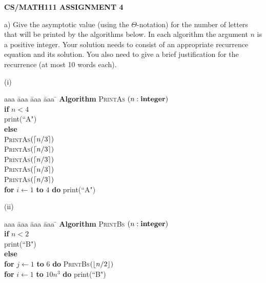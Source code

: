 \documentclass{article}
\begin{document}
\centerline{\large \bf CS/MATH111 ASSIGNMENT 4}

\vskip 0.2in


\vskip 0.1in


\begin{problem}
a)
Give the asymptotic value (using the $\Theta$-notation)
for the number of letters that will be printed by the algorithms below.
In each algorithm the argument $n$ is a positive integer.
Your solution needs to consist of an appropriate recurrence 
equation and its solution. You also need to give a brief justification for
the recurrence (at most 10 words each). 

\bigskip
\noindent
(i)\ \ 
\begin{minipage}[t]{3in}
\begin{tabbing}
aaa \= aaa \= aaa \= aaa \=  \kill
\textbf{Algorithm} \textsc{PrintAs} $(n: \mbox{\bf integer})$ \\
          \> \textbf{if} $n < 4$ \\
          \>\>  print(``A") \\
          \>\textbf{else} \\
          \>\>  \textsc{PrintAs}$({\left\lceil n/3\right\rceil})$\\
          \>\>  \textsc{PrintAs}$({\left\lceil n/3\right\rceil})$\\
          \>\>  \textsc{PrintAs}$({\left\lceil n/3\right\rceil})$\\
          \>\>  \textsc{PrintAs}$({\left\lceil n/3\right\rceil})$\\
           \>\>  \textsc{PrintAs}$({\left\lceil n/3\right\rceil})$\\
      \>\> \textbf{for} $i \leftarrow 1$ \textbf{to} $4$ \textbf{do} print(``A")
\end{tabbing}
\end{minipage}

\bigskip
\noindent
(ii)\ \
\begin{minipage}[t]{3in}
\begin{tabbing}
aaa \= aaa \= aaa \= aaa \=  \kill
\textbf{Algorithm} \textsc{PrintBs} $(n: \mbox{\bf integer})$ \\
          \> \textbf{if} $n < 2$ \\
          \>\>  print(``B") \\
          \>\textbf{else} \\
          \>\>  \textbf{for} $j \leftarrow 1$ \textbf{to} $6$ 
					\textbf{do} \textsc{PrintBs}$({\left\lfloor n/2\right\rfloor})$\\
      \>\> \textbf{for} $i \leftarrow 1$ \textbf{to} $10n^3$ \textbf{do} print(``B")
\end{tabbing}
\end{minipage}


\end{problem}
\end{document}
